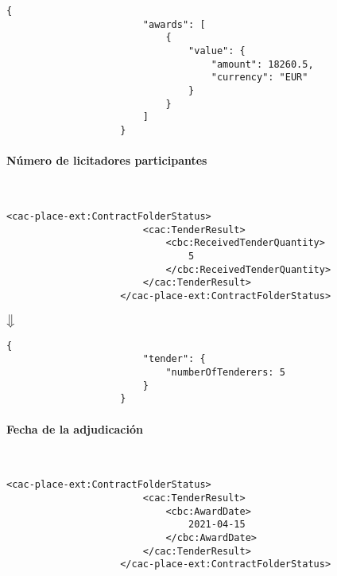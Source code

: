                 \begin{lstlisting}[language=lJSON]
                    {
                        "awards": [
                            {
                                "value": {
                                    "amount": 18260.5,
                                    "currency": "EUR"
                                }
                            }
                        ]
                    }
                \end{lstlisting}
                
            \paragraph{Número de licitadores participantes} \mbox{}\\
                \begin{lstlisting}[language=lXML]
                    <cac-place-ext:ContractFolderStatus>
                        <cac:TenderResult>
                            <cbc:ReceivedTenderQuantity>
                                5
                            </cbc:ReceivedTenderQuantity>
                        </cac:TenderResult>
                    </cac-place-ext:ContractFolderStatus>
                \end{lstlisting}
                
                \begin{center}
                    $\big\Downarrow$
                \end{center}
                
                \begin{lstlisting}[language=lJSON]
                    {
                        "tender": {
                            "numberOfTenderers: 5
                        }
                    }
                \end{lstlisting}
                
            \paragraph{Fecha de la adjudicación} \mbox{}\\
                \begin{lstlisting}[language=lXML]
                    <cac-place-ext:ContractFolderStatus>
                        <cac:TenderResult>
                            <cbc:AwardDate>
                                2021-04-15
                            </cbc:AwardDate>
                        </cac:TenderResult>
                    </cac-place-ext:ContractFolderStatus>
                \end{lstlisting}
                
